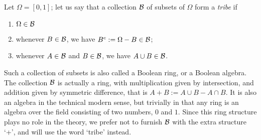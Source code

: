 Let $\Omega=[0,1]$; let us say that a collection ${\cal B}$ of subsets
of $\Omega$ form a {\em tribe} if
\begin{enumerate}
\item $\Omega\in{\cal B}$
\item whenever $B\in{\cal B}$, we have $B^c:=\Omega-B\in{\cal B}$;
\item whenever $A\in{\cal B}$ and $B\in{\cal B}$, we have $A\cup B\in
{\cal B}$.
\end{enumerate}
Such a collection of subsets is also called a Boolean ring, or a Boolean
algebra. The collection ${\cal B}$ is
actually a ring, with multiplication given by intersection, and addition
given by symmetric difference, that is $A+B:=A\cup B-A\cap B$. It is
also an algebra in the technical modern sense, but trivially in that any
ring is an algebra over the field
consisting of two numbers, $0$ and $1$. Since this ring structure plays no
role in the theory, we prefer not to furnish ${\cal B}$ with the extra
structure `+', and will use the word `tribe' instead.

